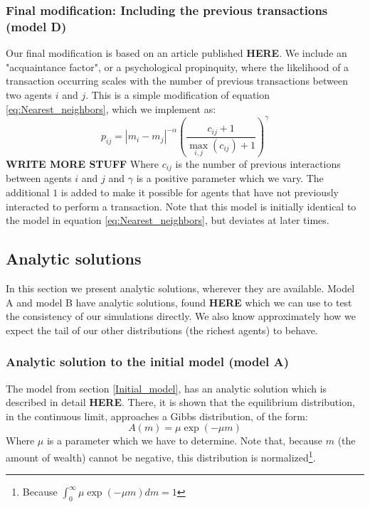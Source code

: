 \documentclass[a4paper, 10pt]{article}
\begin{document}
\subsubsection{Final modification: Including the previous transactions (model D)}\label{Model_D}
Our final modification is based on an article published \textbf{HERE}. We include an "acquaintance factor", or a psychological propinquity, where the likelihood of a transaction occurring scales with the number of previous transactions between two agents $i$ and $j$. This is a simple modification of equation \ref{eq:Nearest_neighbors}, which we implement as:
\begin{equation}\label{eq:nearest_with_previous_transactions}
p_{ij}=|m_i-m_j|^{-\alpha}\left(\frac{c_{ij}+1}{\max_{i,j} (c_{ij})+1}\right)^{\gamma}
\end{equation} 
\textbf{WRITE MORE STUFF}
Where $c_{ij}$ is the number of previous interactions between agents $i$ and $j$ and $\gamma$ is a positive parameter which we vary. The additional $1$ is added to make it possible for agents that have not previously interacted to perform a transaction. Note that this model is initially identical to the model in equation \ref{eq:Nearest_neighbors}, but deviates at later times.
\subsection{Analytic solutions}\label{Analytic_solution}
In this section we present analytic solutions, wherever they are available. Model A and model B have analytic solutions, found \textbf{HERE} which we can use to test the consistency of our simulations directly. We also know approximately how we expect the tail of our other distributions (the richest agents) to behave.
\subsubsection{Analytic solution to the initial model (model A)}
The model from section \ref{Initial_model}, has an analytic solution which is described in detail \textbf{HERE}. There, it is shown that the equilibrium distribution, in the continuous limit, approaches a Gibbs distribution, of the form:
\begin{equation}\label{eq:Analytic_solution_A}
A(m)=\mu \exp(-\mu m)
\end{equation}
Where $\mu$ is a parameter which we have to determine. Note that, because $m$ (the amount of wealth) cannot be negative, this distribution is normalized\footnote{Because $\int_0^{\infty} \mu \exp(-\mu m)dm=1$}.
\end{document}
